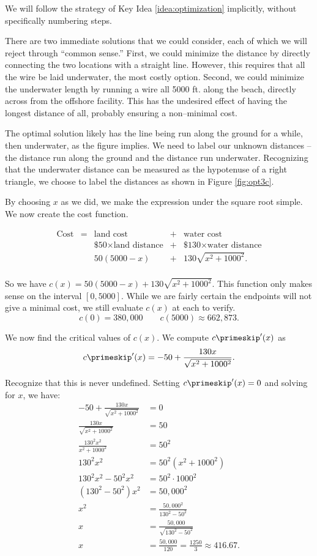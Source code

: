 {We will follow the strategy of Key Idea \ref{idea:optimization} implicitly, without specifically numbering steps.

There are two immediate solutions that we could consider, each of which we will reject through ``common sense.'' First, we could minimize the distance by directly connecting the two locations with a straight line. However, this requires that all the wire be laid underwater, the most costly option. Second, we could minimize the underwater length by running a wire all 5000 ft. along the beach, directly across from the offshore facility. This has the undesired effect of having the longest distance of all, probably ensuring a non--minimal cost.

The optimal solution likely has the line being run along the ground for a while, then underwater, as the figure implies. We need to label our unknown distances -- the distance run along the ground and the distance run underwater. Recognizing that the underwater distance can be measured as the hypotenuse of a right triangle, we choose to label the distances as shown in Figure \ref{fig:opt3c}.


By choosing $x$ as we did, we make the expression under the square root simple. We now create the cost function. 

\[
\begin{array}{ccccc}
\text{Cost} &=&  \text{land cost} &+ & \text{water cost} \\
						&	& \text{\$50}\times \text{land distance} &+& \text{\$130}\times \text{water distance} \\
						&	& 50(5000-x) &+& 130\sqrt{x^2+1000^2}.\\
\end{array}
\]

So we have $c(x) = 50(5000-x)+ 130\sqrt{x^2+1000^2}$. This function only makes sense on the interval $[0,5000]$. While we are fairly certain the endpoints will not give a minimal cost, we still evaluate $c(x)$ at each to verify.
\[
c(0) = 380,000 \quad\quad c(5000) \approx 662,873.
\]

We now find the critical values of $c(x)$. We compute $c\primeskip'(x)$ as 
\[
c\primeskip'(x) = -50+\frac{130x}{\sqrt{x^2+1000^2}}.
\]

Recognize that this is never undefined. Setting $c\primeskip'(x)=0$ and solving for $x$, we have:
\begin{align*}
-50+\frac{130x}{\sqrt{x^2+1000^2}} &= 0 \\
\frac{130x}{\sqrt{x^2+1000^2}}  &= 50\\
\frac{130^2x^2}{x^2+1000^2} &= 50^2\\
130^2x^2 &= 50^2(x^2+1000^2) \\
130^2x^2-50^2x^2 &= 50^2\cdot1000^2\\
(130^2-50^2)x^2 &= 50,000^2\\
x^2 &= \frac{50,000^2}{130^2-50^2}\\
x &= \frac{50,000}{\sqrt{130^2-50^2}}\\
x & = \frac{50,000}{120} =\frac{1250}3\approx 416.67.
\end{align*}

}
